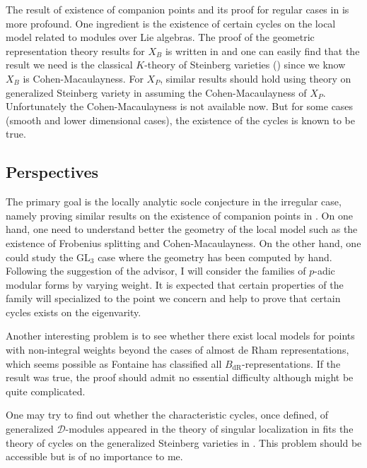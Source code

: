 \documentclass{amsart}
\newcommand{\GL}{\text{GL}}
\numberwithin{equation}{section}
\begin{document}
The result of existence of companion points and its proof for regular cases in \cite{breuil2019local} is more profound. One ingredient is the existence of certain cycles on the local model related to modules over Lie algebras. The proof of the geometric representation theory results for $X_B$ is written in \cite{riche2008geometric} and one can easily find that the result we need is the classical $K$-theory of Steinberg varieties (\cite{Chriss1997RepresentationTA}) since we know $X_B$ is Cohen-Macaulayness. For $X_P$, similar results should hold using theory on generalized Steinberg variety in \cite{douglass2014equivariant} assuming the Cohen-Macaulayness of $X_P$. Unfortunately the Cohen-Macaulayness is not available now. But for some cases (smooth and lower dimensional cases), the existence of the cycles is known to be true.
\subsection{Perspectives}
The primary goal is the locally analytic socle conjecture in the irregular case, namely proving similar results on the existence of companion points in \cite{breuil2019local}. On one hand, one need to understand better the geometry of the local model such as the existence of Frobenius splitting and Cohen-Macaulayness. On the other hand, one could study the $\GL_3$ case where the geometry has been computed by hand. Following the suggestion of the advisor, I will consider the families of $p$-adic modular forms by varying weight. It is expected that certain properties of the family will specialized to the point we concern and help to prove that certain cycles exists on the eigenvarity.\par
Another interesting problem is to see whether there exist local models for points with non-integral weights beyond the cases of almost de Rham representations, which seems possible as Fontaine has classified all $B_{\text{dR}}$-representations. If the result was true, the proof should admit no essential difficulty although might be quite complicated.\par
One may try to find out whether the characteristic cycles, once defined, of generalized $\mathcal{D}$-modules appeared in the theory of singular localization in \cite{Backelin2015singular} fits the theory of cycles on the generalized Steinberg varieties in \cite{douglass2014equivariant}. This problem should be accessible but is of no importance to me.


\end{document}
